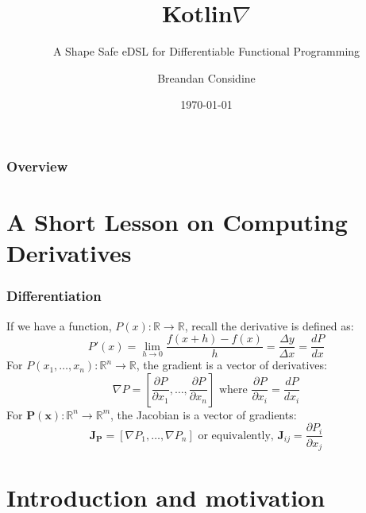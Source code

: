 \documentclass{beamer}
\title{Kotlin\texorpdfstring{$\nabla$}{}}
\subtitle{A Shape Safe eDSL for Differentiable Functional Programming}
\author{Breandan Considine}
\institute[UdeM]{
Universit\'e de Montr\'eal \\
\medskip
\textit{breandan.considine@umontreal.ca}
}
\date{\today}
\begin{document}
    \begin{frame}
        \titlepage
    \end{frame}

    \begin{frame}
        \frametitle{Overview}
        \tableofcontents
    \end{frame}

    \section{A Short Lesson on Computing Derivatives}


    \begin{frame}
        \frametitle{Differentiation}
        If we have a function, $P(x): \mathbb{R}\rightarrow\mathbb{R}$, recall the derivative is defined as:
        \begin{equation}
            P'(x) = \lim _{h\to 0}{\frac {f(x+h)-f(x)}{h}} = \frac{\Delta y}{\Delta x} = \frac{dP}{dx}
        \end{equation}
        For $P(x_1, \dots, x_n): \mathbb{R}^n\rightarrow\mathbb{R}$, the gradient is a vector of derivatives:
        \begin{equation}
            \nabla P = \left[\frac{\partial P}{\partial x_1}, \dots, \dfrac{\partial P}{\partial x_n}\right]\text{ where }\frac{\partial P}{\partial x_i} = \frac{dP}{dx_i}
        \end{equation}
        For $\mathbf{P}(\mathbf{x}): \mathbb{R}^n\rightarrow\mathbb{R}^m$, the Jacobian is a vector of gradients:
        \begin{equation}
            \mathbf{J}_\mathbf{P} = \left[\nabla P_1, \dots, \nabla P_n \right] \text{ or equivalently, } \mathbf{J}_{ij} = \frac{\partial P_i}{\partial x_j}
        \end{equation}
    \end{frame}


    \section{Introduction and motivation}
\end{document}

